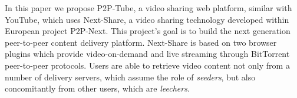 In this paper we propose P2P-Tube, a video sharing web platform, similar with YouTube, which uses Next-Share, a video sharing technology developed within European project P2P-Next. This project's goal is to build the next generation peer-to-peer content delivery platform. Next-Share is based on two browser plugins which provide video-on-demand and live streaming through BitTorrent peer-to-peer protocols. Users are able to retrieve video content not only from a number of delivery servers, which assume the role of \textit{seeders}, but also concomitantly from other users, which are \textit{leechers}.